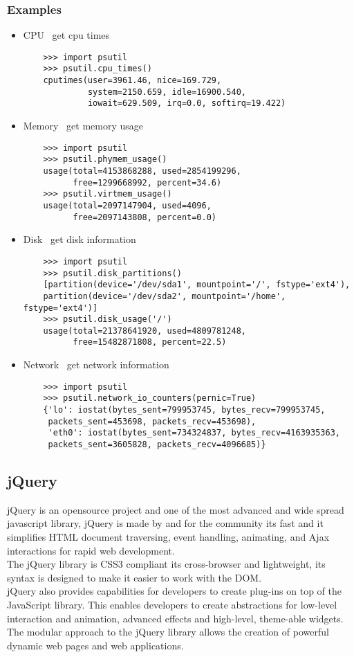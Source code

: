 \subsubsection{Examples}
\begin{itemize}
  \item CPU \textendash\ get cpu times 
  \begin{verbatim}
    >>> import psutil
    >>> psutil.cpu_times()
    cputimes(user=3961.46, nice=169.729, 
             system=2150.659, idle=16900.540, 
             iowait=629.509, irq=0.0, softirq=19.422)
    \end{verbatim}
  \item Memory \textendash\ get memory usage
  \begin{verbatim}
    >>> import psutil
    >>> psutil.phymem_usage()
    usage(total=4153868288, used=2854199296, 
          free=1299668992, percent=34.6)
    >>> psutil.virtmem_usage()
    usage(total=2097147904, used=4096, 
          free=2097143808, percent=0.0)          
  \end{verbatim}
  \item Disk \textendash\ get disk information
  \begin{verbatim}
    >>> import psutil
    >>> psutil.disk_partitions()
    [partition(device='/dev/sda1', mountpoint='/', fstype='ext4'),
    partition(device='/dev/sda2', mountpoint='/home', fstype='ext4')]
    >>> psutil.disk_usage('/')
    usage(total=21378641920, used=4809781248, 
          free=15482871808, percent=22.5)
  \end{verbatim}
  \item Network \textendash\ get network information
  \begin{verbatim}
    >>> import psutil
    >>> psutil.network_io_counters(pernic=True)
    {'lo': iostat(bytes_sent=799953745, bytes_recv=799953745, 
     packets_sent=453698, packets_recv=453698), 
     'eth0': iostat(bytes_sent=734324837, bytes_recv=4163935363, 
     packets_sent=3605828, packets_recv=4096685)}
  \end{verbatim}
\end{itemize}
\subsection{jQuery}
jQuery is an opensource project and one of the most advanced and wide spread javascript library, jQuery is made 
by and for the community its fast and it simplifies HTML document traversing, event handling, animating, and 
Ajax interactions for rapid web development.\\
The jQuery library is CSS3 compliant its cross-browser and lightweight, its syntax is designed to make it easier
to work with the DOM.\\
jQuery also provides capabilities for developers to create plug-ins on top of the JavaScript library. 
This enables developers to create abstractions for low-level interaction and animation, advanced effects and 
high-level, theme-able widgets. The modular approach to the jQuery library allows the creation of powerful dynamic 
web pages and web applications.
